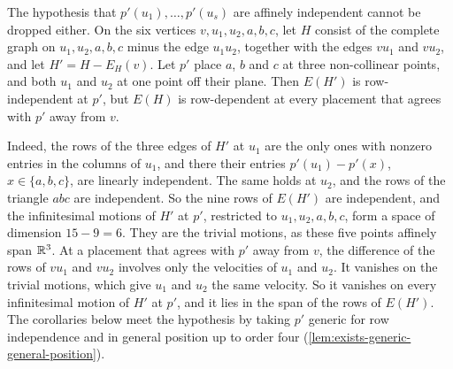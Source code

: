 The hypothesis that $p'(u_1), \dots, p'(u_s)$ are affinely independent
cannot be dropped either. On the six vertices $v, u_1, u_2, a, b, c$,
let $H$ consist of the complete graph on $u_1, u_2, a, b, c$ minus the
edge $u_1u_2$, together with the edges $vu_1$ and $vu_2$, and let
$H' = H - E_H(v)$. Let $p'$ place $a$, $b$ and $c$ at three
non-collinear points, and both $u_1$ and $u_2$ at one point off their
plane. Then $E(H')$ is row-independent at $p'$, but $E(H)$ is
row-dependent at every placement that agrees with $p'$ away from $v$.

Indeed, the rows of the three edges of $H'$ at $u_1$ are the only ones
with nonzero entries in the columns of $u_1$, and there their entries
$p'(u_1) - p'(x)$, $x \in \{a, b, c\}$, are linearly independent. The
same holds at $u_2$, and the rows of the triangle $abc$ are independent.
So the nine rows of $E(H')$ are independent, and the infinitesimal
motions of $H'$ at $p'$, restricted to $u_1, u_2, a, b, c$, form a space
of dimension $15 - 9 = 6$. They are the trivial motions, as these five
points affinely span ${\mathbb{R}}^3$. At a placement that agrees with $p'$ away
from $v$, the difference of the rows of $vu_1$ and $vu_2$ involves only
the velocities of $u_1$ and $u_2$. It vanishes on the trivial motions,
which give $u_1$ and $u_2$ the same velocity. So it vanishes on every
infinitesimal motion of $H'$ at $p'$, and it lies in the span of the
rows of $E(H')$. The corollaries below meet the hypothesis by taking
$p'$ generic for row independence and in general position up to order
four (\cref{lem:exists-generic-general-position}).

